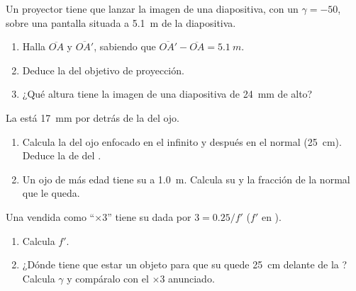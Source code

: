 \begin{exercise}[$\star\star\star$]\label{exo:g11:lenses-and-eye:12}
Un proyector tiene que lanzar la imagen de una diapositiva, con un
 $\gamma = -50$, sobre una pantalla situada a \qty{5.1}{m} de la
diapositiva.
\begin{enumerate}
  \item Halla $\overline{OA}$ y $\overline{OA'}$, sabiendo que
        $\overline{OA'} - \overline{OA} = \qty{5.1}{m}$.
  \item Deduce la  del objetivo de proyección.
  \item ¿Qué altura tiene la imagen de una diapositiva de \qty{24}{mm}
        de alto?
\end{enumerate}
\end{exercise}

\begin{exercise}[$\star\star\star$]\label{exo:g11:lenses-and-eye:13}
La  está \qty{17}{mm} por detrás de la  del ojo.
\begin{enumerate}
  \item Calcula la  del ojo enfocado en el infinito y
        después en el  normal (\qty{25}{cm}). Deduce la
         de  del .
  \item Un ojo de más edad tiene su  a \qty{1.0}{m}.
        Calcula su  y la fracción de la  normal que le
        queda.
\end{enumerate}
\end{exercise}

\begin{exercise}[$\star\star\star$]\label{exo:g11:lenses-and-eye:14}
Una  vendida como ``$\times 3$'' tiene su  dada por
$3 = 0.25/f'$ ($f'$ en ).
\begin{enumerate}
  \item Calcula $f'$.
  \item ¿Dónde tiene que estar un objeto para que su 
        quede \qty{25}{cm} delante de la ? Calcula $\gamma$ y
        compáralo con el $\times 3$ anunciado.
\end{enumerate}
\end{exercise}

